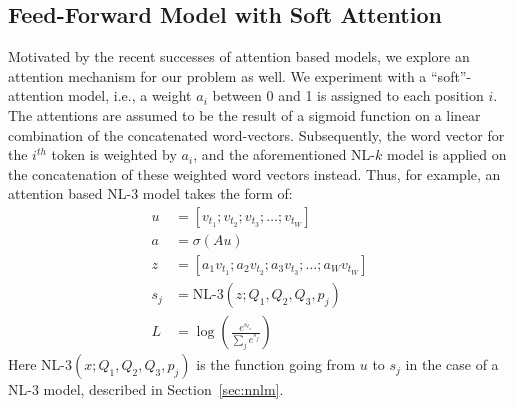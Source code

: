 \subsection{Feed-Forward Model with Soft Attention}
\label{sec:annlm}
Motivated by the recent successes of attention based models, we explore an
attention mechanism for our problem as well. We experiment with a
``soft''-attention model, i.e., a weight $a_i$ between 0 and 1 is assigned to
each position $i$. The attentions are assumed to be the result of a sigmoid
function on a linear combination of the concatenated word-vectors. Subsequently,
the word vector for the $i^{th}$ token is weighted by $a_i$, and the
aforementioned NL-$k$ model is applied on the concatenation of these weighted
word vectors instead. Thus, for example, an attention based NL-$3$ model takes
the form of:
\begin{align}
u &= [v_{t_1}; v_{t_2}; v_{t_3}; \ldots; v_{t_W}]\\
a &= \sigma(Au)\\
z &= [a_1v_{t_1}; a_2v_{t_2}; a_3v_{t_3}; \ldots; a_Wv_{t_W}]\\
s_j &= \text{NL-}3(z ; Q_1, Q_2, Q_3, p_j)\\
L &= \log\left(\frac{e^{s_{t_o}}}{\sum_j{e^{s_j}}}\right)
\end{align}
Here NL-$3(x ; Q_1, Q_2, Q_3, p_j)$ is the function going from $u$ to $s_j$ in
the case of a NL-$3$ model, described in Section~\ref{sec:nnlm}.
